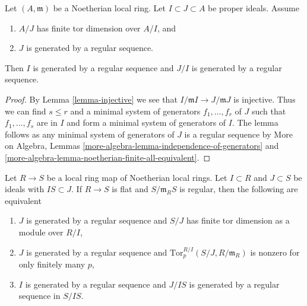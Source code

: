 \begin{lemma}
\label{lemma-regular-sequence}
Let $(A, \mathfrak m)$ be a Noetherian local ring. Let
$I \subset J \subset A$ be proper ideals. Assume
\begin{enumerate}
\item $A/J$ has finite tor dimension over $A/I$, and
\item $J$ is generated by a regular sequence.
\end{enumerate}
Then $I$ is generated by a regular sequence and $J/I$
is generated by a regular sequence.
\end{lemma}

\begin{proof}
By Lemma \ref{lemma-injective} we see that
$I/\mathfrak m I \to J/\mathfrak m J$
is injective. Thus we can find $s \leq r$ and a minimal system of
generators $f_1, \ldots, f_r$ of $J$ such that $f_1, \ldots, f_s$ are in $I$
and form a minimal system of generators of $I$.
The lemma follows as any minimal system of generators of $J$
is a regular sequence by
More on Algebra, Lemmas
\ref{more-algebra-lemma-independence-of-generators} and
\ref{more-algebra-lemma-noetherian-finite-all-equivalent}.
\end{proof}

\begin{lemma}
\label{lemma-perfect-map-ci}
Let $R \to S$ be a local ring map of Noetherian local rings.
Let $I \subset R$ and $J \subset S$ be ideals with
$IS \subset J$. If $R \to S$ is flat and $S/\mathfrak m_RS$ is
regular, then the following are equivalent
\begin{enumerate}
\item $J$ is generated by a regular sequence and
$S/J$ has finite tor dimension as a module over $R/I$,
\item $J$ is generated by a regular sequence and
$\text{Tor}^{R/I}_p(S/J, R/\mathfrak m_R)$ is nonzero
for only finitely many $p$,
\item $I$ is generated by a regular sequence
and $J/IS$ is generated by a regular sequence in $S/IS$.
\end{enumerate}
\end{lemma}

